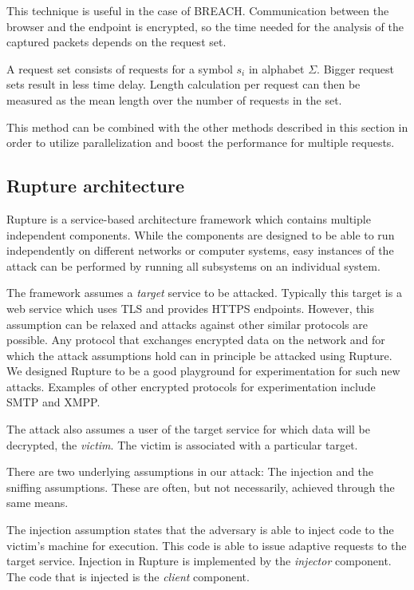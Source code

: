 \documentclass[conference, letterpaper, 10pt]{IEEEtran}
\begin{document}
This technique is useful in the case of BREACH. Communication between the browser and the
endpoint is encrypted, so the time needed for the analysis of
the captured packets depends on the request set.

A request set consists of requests for a symbol $s_i$ in alphabet
$\Sigma$.
Bigger request sets result in less time delay. Length calculation per request
can then be measured as the mean length over the number of requests in the set.

This method can be combined with the other methods described in this section
in order to utilize parallelization and boost the performance for
multiple requests.

\subsection{Rupture architecture}\label{app:rupture}
Rupture is a service-based architecture framework which contains multiple
independent components. While the components are designed to be able to run
independently on different networks or computer systems, easy instances of the
attack can be performed by running all subsystems on an individual system.

The framework assumes a \textit{target} service to be attacked. Typically
this target is a web service which uses TLS and
provides HTTPS endpoints. However, this assumption can
be relaxed and attacks against other similar protocols are possible. Any
protocol that exchanges encrypted data on the network and for which
the attack assumptions hold can in principle be attacked using Rupture. We
designed Rupture to be a good playground for experimentation for such new
attacks. Examples of other encrypted protocols for experimentation
include SMTP and XMPP.

The attack also assumes a user of the target service for which data will be
decrypted, the \textit{victim}. The victim is associated with a particular
target.

There are two underlying assumptions in our attack: The injection and the
sniffing assumptions. These are often, but not necessarily, achieved through the same means.

The injection assumption states that the adversary is able to inject code to the
victim's machine for execution. This code is able to issue adaptive requests to
the target service. Injection in Rupture is implemented by the
\textit{injector} component. The code that is injected is the \textit{client}
component.
\end{document}
